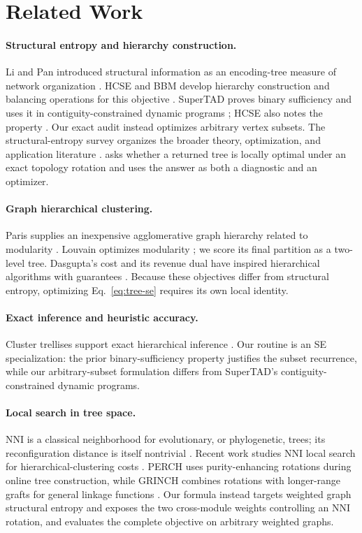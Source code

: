 \section{Related Work}
\paragraph{Structural entropy and hierarchy construction.}
Li and Pan introduced structural information as an encoding-tree measure of
network organization \cite{li2016}. HCSE and BBM develop hierarchy
construction and balancing operations for this objective \cite{pan2025}.
SuperTAD proves binary sufficiency and uses it in contiguity-constrained dynamic
programs \cite{zhang2021supertad}; HCSE also notes the property \cite{pan2025}.
Our exact audit instead optimizes arbitrary vertex subsets.
The structural-entropy survey organizes the broader theory, optimization, and
application literature \cite{su2025survey}.
\NEST asks whether a returned tree is locally optimal under an exact topology
rotation and uses the answer as both a diagnostic and an optimizer.

\paragraph{Graph hierarchical clustering.}
Paris supplies an inexpensive agglomerative graph hierarchy related to
modularity \cite{bonald2018paris}. Louvain optimizes modularity
\cite{blondel2008}; we score its final partition as a two-level tree.
Dasgupta's cost and its revenue dual have inspired hierarchical algorithms with
guarantees \cite{dasgupta2016,moseley2017}. Because these objectives differ
from structural entropy, optimizing Eq.~\eqref{eq:tree-se} requires its own
local identity.

\paragraph{Exact inference and heuristic accuracy.}
Cluster trellises support exact hierarchical inference \cite{macaluso2021}.
Our routine is an SE specialization:
the prior binary-sufficiency property justifies the subset recurrence, while
our arbitrary-subset formulation differs from SuperTAD's contiguity-constrained
dynamic programs.

\paragraph{Local search in tree space.}
NNI is a classical neighborhood for evolutionary, or phylogenetic, trees; its
reconfiguration distance is itself nontrivial \cite{litrompzhang1996}. Recent
work studies NNI local search for hierarchical-clustering costs
\cite{jowhari2024}. PERCH uses purity-enhancing rotations during online tree
construction, while GRINCH combines rotations with longer-range grafts for
general linkage functions \cite{kobren2017perch,monath2019grinch}. Our formula
instead targets weighted graph structural entropy and exposes the two
cross-module weights controlling an NNI rotation, and evaluates the complete
objective on arbitrary weighted graphs.
